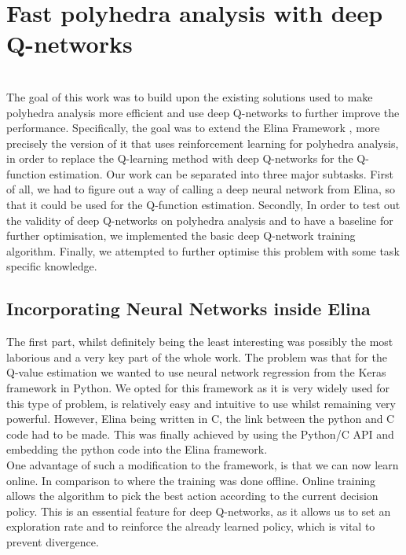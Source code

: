 
\chapter{Fast polyhedra analysis with deep Q-networks}
\mbox{}\\
The goal of this work was to build upon the existing solutions used to make polyhedra analysis more efficient and use deep Q-networks to further improve the performance. Specifically, the goal was to extend the Elina Framework \cite{elina}, more precisely the version of it that uses reinforcement learning for polyhedra analysis, in order to replace the Q-learning method with deep Q-networks for the Q-function estimation. Our work can be separated into three major subtasks. First of all, we had to figure out a way of calling a deep neural network from Elina, so that it could be used for the Q-function estimation. Secondly, In order to test out the validity of deep Q-networks on polyhedra analysis and to have a baseline for further optimisation, we implemented the basic deep Q-network training algorithm. Finally, we attempted to further optimise this problem with some task specific knowledge.

\section{Incorporating Neural Networks inside Elina}
The first part, whilst definitely being the least interesting was possibly the most laborious and a very key part of the whole work. The problem was that for the Q-value estimation we wanted to use neural network regression from the Keras framework in Python. We opted for this framework as it is very widely used for this type of problem, is relatively easy and intuitive to use whilst remaining very powerful. However, Elina being written in C, the link between the python and C code had to be made. This was finally achieved  by using the Python/C API and embedding the python code into the Elina framework.\\
One advantage of such a modification to the framework, is that we can now learn online. In comparison to \cite{singh2018fast} where the training was done offline. Online training allows the algorithm to pick the best action according to the current decision policy. This is an essential feature for deep Q-networks, as it allows us to set an exploration rate and to reinforce the already learned policy, which is vital to prevent divergence.
